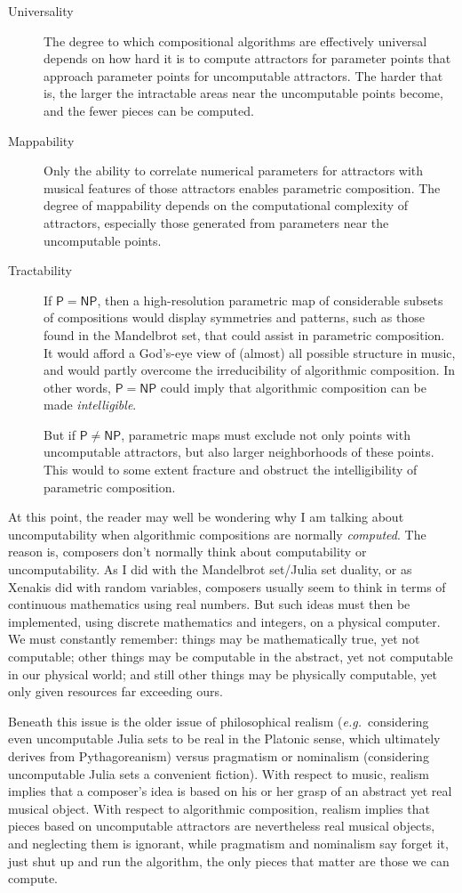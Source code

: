 \documentclass[11pt,papersize=a4]{scrartcl}
\begin{document}
\begin{description}
\item[Universality] The degree to which compositional algorithms are effectively universal depends on how hard it is to compute attractors for parameter points that approach parameter points for uncomputable attractors. The harder that is, the larger the intractable areas near the uncomputable points become, and the fewer pieces can be computed.
\item[Mappability] Only the ability to correlate numerical parameters for attractors with musical features of those attractors enables parametric composition. The degree of mappability depends on the computational complexity of attractors, especially those generated from parameters near the uncomputable points.
\item[Tractability] If $\mathsf{P} = \mathsf{NP}$, then a high-resolution parametric map of considerable subsets of compositions would display symmetries and patterns, such as those found in the Mandelbrot set, that could assist in parametric composition. It would afford a God's-eye view of (almost) all possible structure in music, and would partly overcome the irreducibility of algorithmic composition. In other words, $\mathsf{P} = \mathsf{NP}$ could imply that algorithmic composition can be made \emph{intelligible}.

But if $\mathsf{P} \ne \mathsf{NP}$, parametric maps must exclude not only points with uncomputable attractors, but also larger neighborhoods of these points. This would to some extent fracture and obstruct the intelligibility of parametric composition.
\end{description}

At this point, the reader may well be wondering why I am talking about uncomputability when algorithmic compositions are normally \emph{computed}. The reason is, composers don't normally think about computability or uncomputability. As I did with the Mandelbrot set/Julia set duality, or as Xenakis did with random variables, composers usually seem to think in terms of continuous mathematics using real numbers. But such ideas must then be implemented, using discrete mathematics and integers, on a physical computer. We must constantly remember: things may be mathematically true, yet not computable; other things may be computable in the abstract, yet not computable in our physical world; and still other things may be physically computable, yet only given resources far exceeding ours. 

Beneath this issue is the older issue of philosophical realism (\emph{e.g.}\ considering even uncomputable Julia sets to be real in the Platonic sense, which ultimately derives from Pythagoreanism) versus pragmatism or nominalism (considering uncomputable Julia sets a convenient fiction). With respect to music, realism implies that a composer's idea is based on his or her grasp of an abstract yet real musical object. With respect to algorithmic composition, realism implies that pieces based on uncomputable attractors are nevertheless real musical objects, and neglecting them is ignorant, while pragmatism and nominalism say forget it, just shut up and run the algorithm, the only pieces that matter are those we can compute.
\end{document}
